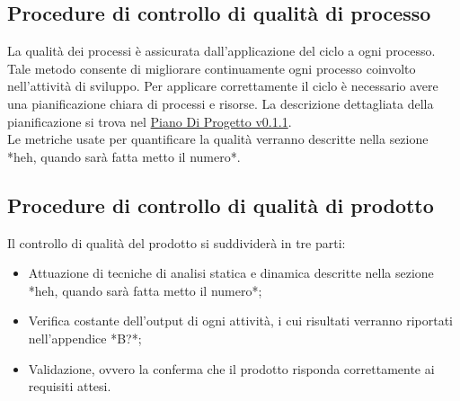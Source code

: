 \documentclass{scalatekids-article}
\begin{document}
\subsection{Procedure di controllo di qualità di processo}
La qualità dei processi è assicurata dall'applicazione del ciclo  a ogni processo. Tale metodo consente di migliorare continuamente ogni processo coinvolto nell'attività di sviluppo. Per applicare correttamente il ciclo  è necessario avere una pianificazione chiara di processi e risorse. La descrizione dettagliata della pianificazione si trova nel \href{run:./PianoDiProgetto\_v0.1.1.pdf}{Piano Di Progetto v0.1.1}.\\
Le metriche usate per quantificare la qualità verranno descritte nella sezione *heh, quando sarà fatta metto il numero*.
\subsection{Procedure di controllo di qualità di prodotto}
Il controllo di qualità del prodotto si suddividerà in tre parti:
\begin{itemize}
\item{Attuazione di tecniche di analisi statica e dinamica descritte nella sezione *heh, quando sarà fatta metto il numero*;}
\item{Verifica costante dell'output di ogni attività, i cui risultati verranno riportati nell'appendice *B?*;}
\item{Validazione, ovvero la conferma che il prodotto risponda correttamente ai requisiti attesi.}
\end{itemize}
\end{document}
